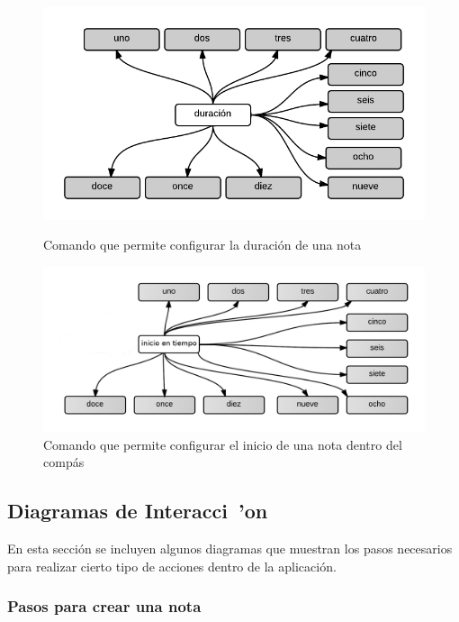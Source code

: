 \begin{figure}[H]
\begin{minipage}[b]{0.5\linewidth}
\centering
\includegraphics[width=0.9\linewidth]{./graphics/cmd-dur.png}
\caption{Comando que permite configurar la duraci\'on de una nota}
\label{figure:cmd-dur-anexo}
\end{minipage}
\quad
\begin{minipage}[b]{0.5\linewidth}
\centering
\includegraphics[width=1.1\linewidth]{./graphics/cmd-note-tiempo.png}
\caption{Comando que permite configurar el inicio de una nota dentro del comp\'as}
\label{figure:cmd-note-tiempo-anexo}
\end{minipage}
\end{figure}

\subsection{Diagramas de Interacci\ 'on}

En esta secci\'on se incluyen algunos diagramas que muestran los pasos necesarios para realizar cierto 
tipo de acciones dentro de la aplicaci\'on.

\subsubsection{Pasos para crear una nota}

